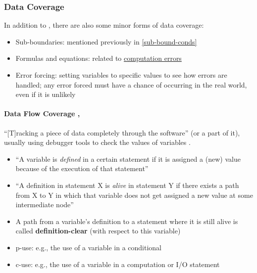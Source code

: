 \subsubsection{Data Coverage \cite[p.~114-116]{patton_software_2006}}

In addition to , there are also some minor forms of
data coverage:

\begin{itemize}
      \item Sub-boundaries: mentioned previously in \ref{sub-bound-conds}
      \item Formulas and equations: related to
            \hyperref[comp-errors]{computation errors}
      \item Error forcing: setting variables to specific values to see how
            errors are handled; any error forced must have a chance of
            occurring in the real world, even if it is unlikely
            \cite[p.~116]{patton_software_2006}
\end{itemize}

\paragraph{Data Flow Coverage \cite[p.~114]{patton_software_2006},
      \cite[pp.~424-425]{van_vliet_software_2000}}
\label{data-flow-coverage}

``[T]racking a piece of data completely through the software'' (or a part of
it), usually using debugger tools to check the values of variables
\cite[p.~114]{patton_software_2006}.

\begin{itemize}
      \item ``A variable is \emph{defined} in a certain statement if it is
            assigned a (new) value because of the execution of that
            statement'' \cite[p.~424]{van_vliet_software_2000}
      \item ``A definition in statement X is \emph{alive} in statement Y if
            there exists a path from X to Y in which that variable does not
            get assigned a new value at some intermediate node''
            \cite[p.~424]{van_vliet_software_2000}
      \item A path from a variable's definition to a statement where it is
            still alive is called \textbf{definition-clear} (with respect to
            this variable) \cite[p.~424]{van_vliet_software_2000}
      \item \acf{p-use}: e.g., the use of a variable in a conditional
            \cite[p.~424]{van_vliet_software_2000}
      \item \acf{c-use}: e.g., the use of a variable in a computation or I/O
            statement \cite[p.~424]{van_vliet_software_2000}
\end{itemize}

